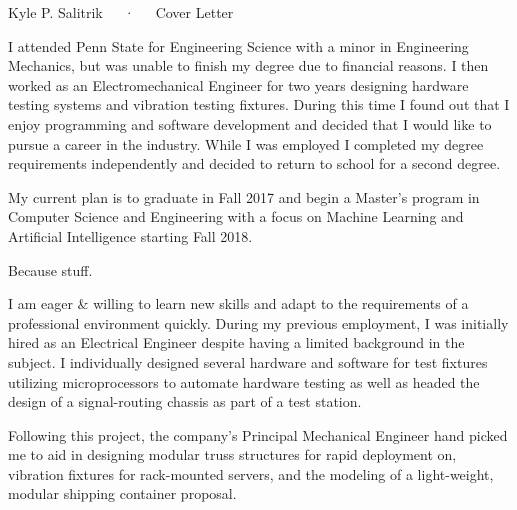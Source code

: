 \documentclass[12pt, a4paper]{awesome-cv}
\begin{document}
\makecvheader[C]

\makecvfooter
  {}
  {Kyle P. Salitrik~~~·~~~Cover Letter}
  {}

\makelettertitle

\begin{cvletter}

\quad I attended Penn State for Engineering Science with a minor in Engineering Mechanics, but was unable to finish my degree due to financial reasons. I then worked as an Electromechanical Engineer for two years designing hardware testing systems and vibration testing fixtures. During this time I found out that I enjoy programming and software development and decided that I would like to pursue a career in the industry. While I was employed I completed my degree requirements independently and decided to return to school for a second degree.

\quad My current plan is to graduate in Fall 2017 and begin a Master's program in Computer Science and Engineering with a focus on Machine Learning and Artificial Intelligence starting Fall 2018.

\quad Because stuff.

\quad I am eager \& willing to learn new skills and adapt to the requirements of a professional environment quickly. During my previous employment, I was initially hired as an Electrical Engineer despite having a limited background in the subject. I individually designed several hardware and software for test fixtures utilizing microprocessors to automate hardware testing as well as headed the design of a signal-routing chassis as part of a test station.

\quad Following this project, the company's Principal Mechanical Engineer hand picked me to aid in designing modular truss structures for rapid deployment on, vibration fixtures for rack-mounted servers, and the modeling of a light-weight, modular shipping container proposal.

\end{cvletter}


\makeletterclosing
\end{document}

